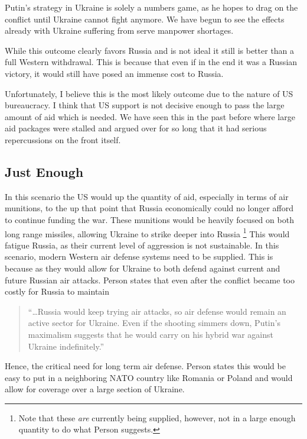 \documentclass{article}
\begin{document}
        Putin's strategy in Ukraine is solely a numbers game, as he hopes to drag on the conflict until Ukraine cannot fight anymore. We have begun to see the effects already with Ukraine suffering from serve manpower shortages. 

        While this outcome clearly favors Russia and is not ideal it still is better than a full Western withdrawal. This is because that even if in the end it was a Russian victory, it would still have posed an immense cost to Russia. 

        Unfortunately, I believe this is the most likely outcome due to the nature of US bureaucracy. I think that US support is not decisive enough to pass the large amount of aid which is needed. We have seen this in the past before where large aid packages were stalled and argued over for so long that it had serious repercussions on the front itself. 

    \subsection{Just Enough}

        In this scenario the US would up the quantity of aid, especially in terms of air munitions, to the up that point that Russia economically could no longer afford to continue funding the war. These munitions would be heavily focused on both long range missiles, allowing Ukraine to strike deeper into Russia \footnote{Note that these \textit{are} currently being supplied, however, not in a large enough quantity to do what Person suggests.} This would fatigue Russia, as their current level of aggression is not sustainable. In this scenario, modern Western air defense systems need to be supplied. This is because as they would allow for Ukraine to both defend against current and future Russian air attacks. Person states that even after the conflict became too costly for  Russia to maintain 
        
        \begin{quote}
            ``\ldots Russia would keep trying air attacks, so air defense would remain an active sector for Ukraine. Even if the shooting simmers down, Putin's maximalism suggests that he would carry on his hybrid war against Ukraine indefinitely.'' \parencite{person_2025}
        \end{quote}

        Hence, the critical need for long term air defense. Person states this would be easy to put in a neighboring NATO country like Romania or Poland and would allow for coverage over a large section of Ukraine.
        
\end{document}
